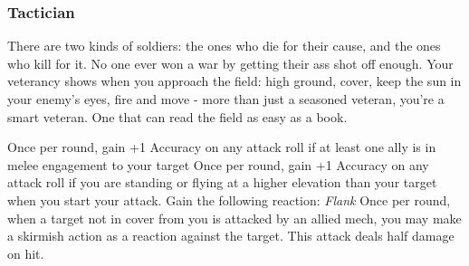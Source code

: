 \subsubsection{Tactician}

\begin{talent}
{There are two kinds of soldiers: the ones who die for their cause, and the ones who kill for it. No one ever won a war by getting their ass shot off enough. Your veterancy shows when you approach the field: high ground, cover, keep the sun in your enemy’s eyes, fire and move - more than just a seasoned veteran, you’re a smart veteran. One that can read the field as easy as a book.} 

Once per round, gain +1 Accuracy on any attack roll if at least one ally is in melee engagement to your target 
Once per round, gain +1 Accuracy on any attack roll if you are standing or flying at a higher elevation than your target when you start your attack. 
Gain the following reaction:\newline 
\textit{Flank}\newline
\Reaction\newline
Once per round, when a target not in cover from you is attacked by an allied mech, you may make a skirmish action as a reaction against the target. This attack deals half damage on hit.
\end{talent}